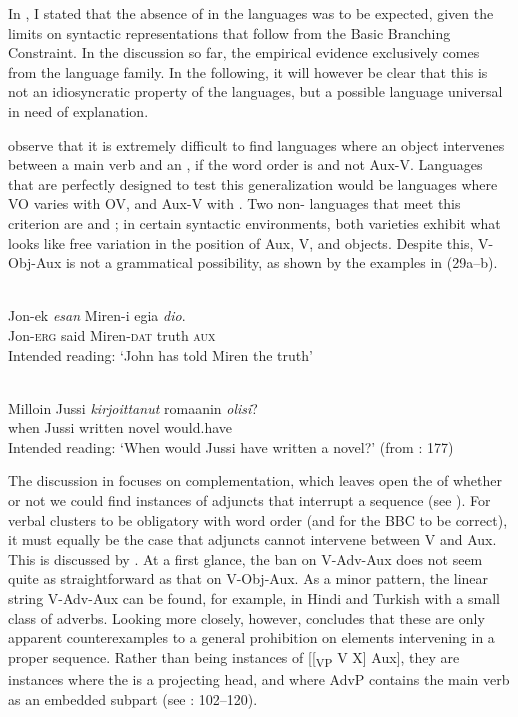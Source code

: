 \documentclass[output=paper, colorlinks, citecolor=brown]{langscibook}
\begin{document}
In , I stated that the absence of  in the  languages was to be expected, given the limits on syntactic representations that follow from the Basic Branching Constraint. In the discussion so far, the empirical evidence exclusively comes from the  language family. In the following, it will however be clear that this is not an idiosyncratic property of the  languages, but a possible language universal in need of explanation.


\citet{BiberauerEtAl2014} observe that it is extremely difficult to find languages where an object intervenes between a main verb and an , if the word order is  and not Aux-V. Languages that are perfectly designed to test this generalization would be languages where VO varies with OV, and Aux-V with . Two non- languages that meet this criterion are  and ; in certain syntactic environments, both varieties exhibit what looks like free variation in the position of Aux, V, and objects. Despite this, V-Obj-Aux is not a grammatical possibility, as shown by the examples in (29a–b).


\ea
\label{ex:sangfelt:29}
\ea \ili{}\label{ex:sangfelt:29a}\\
\gll * Jon-ek \textit{esan} {Miren-i} {egia} \textit{dio}. \\
 {} Jon-\textsc{erg} said Miren-\textsc{dat} truth \textsc{aux}\\
\glt Intended reading: ‘John has told Miren the truth’

\ex {}\label{ex:sangfelt:29b}\\
\gll * Milloin Jussi \textit{kirjoittanut} {romaanin} \textit{olisi}? \\
 {} when Jussi written novel would.have\\
\glt Intended reading: ‘When would Jussi have written a novel?’ (from \citealt{BiberauerEtAl2014}: 177)\\
\z 
\z 


The discussion in \citet{BiberauerEtAl2014} focuses on complementation, which leaves open the  of whether or not we could find instances of adjuncts that interrupt a  sequence (see ). For verbal clusters to be obligatory with  word order (and for the BBC to be correct), it must equally be the case that adjuncts cannot intervene between V and Aux. This  is discussed by \citet{Sheehan2017Final}. At a first glance, the ban on V-Adv-Aux does not seem quite as straightforward as that on V-Obj-Aux. As a minor pattern, the linear string V-Adv-Aux can be found, for example, in Hindi and Turkish with a small class of adverbs. Looking more closely, however, \citet{Sheehan2017Final} concludes that these are only apparent counterexamples to a general prohibition on elements intervening in a proper  sequence. Rather than being instances of [[\textsubscript{VP} V X] Aux], they are instances where the  is a projecting head, and where AdvP contains the main verb as an embedded subpart (see \citealt{Sheehan2017Final}: 102–120).
\end{document}
